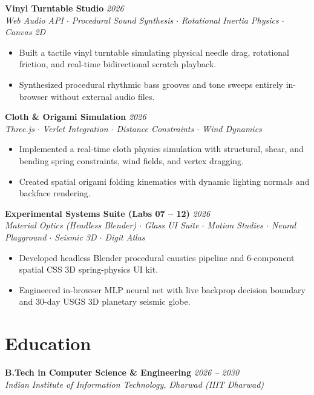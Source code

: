 \documentclass[10pt,a4paper]{article}
\begin{document}
\textbf{Vinyl Turntable Studio} \hfill \textit{2026} \\
\textit{Web Audio API $\cdot$ Procedural Sound Synthesis $\cdot$ Rotational Inertia Physics $\cdot$ Canvas 2D}
\begin{itemize}[leftmargin=12pt, itemsep=1pt]
    \item Built a tactile vinyl turntable simulating physical needle drag, rotational friction, and real-time bidirectional scratch playback.
    \item Synthesized procedural rhythmic bass grooves and tone sweeps entirely in-browser without external audio files.
\end{itemize}

\textbf{Cloth \& Origami Simulation} \hfill \textit{2026} \\
\textit{Three.js $\cdot$ Verlet Integration $\cdot$ Distance Constraints $\cdot$ Wind Dynamics}
\begin{itemize}[leftmargin=12pt, itemsep=1pt]
    \item Implemented a real-time cloth physics simulation with structural, shear, and bending spring constraints, wind fields, and vertex dragging.
    \item Created spatial origami folding kinematics with dynamic lighting normals and backface rendering.
\end{itemize}

\textbf{Experimental Systems Suite (Labs 07 -- 12)} \hfill \textit{2026} \\
\textit{Material Optics (Headless Blender) $\cdot$ Glass UI Suite $\cdot$ Motion Studies $\cdot$ Neural Playground $\cdot$ Seismic 3D $\cdot$ Digit Atlas}
\begin{itemize}[leftmargin=12pt, itemsep=1pt]
    \item Developed headless Blender procedural caustics pipeline and 6-component spatial CSS 3D spring-physics UI kit.
    \item Engineered in-browser MLP neural net with live backprop decision boundary and 30-day USGS 3D planetary seismic globe.
\end{itemize}

\section*{Education}
\textbf{B.Tech in Computer Science \& Engineering} \hfill \textit{2026 -- 2030} \\
\textit{Indian Institute of Information Technology, Dharwad (IIIT Dharwad)}
\end{document}
